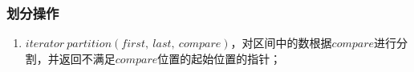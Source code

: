 \subsubsection{划分操作}
\begin{enumerate}
    \item $iterator\ partition(first,\ last,\ compare)$，对区间中的数根据$compare$进行分割，并返回不满足$compare$位置的起始位置的指针；
\end{enumerate}